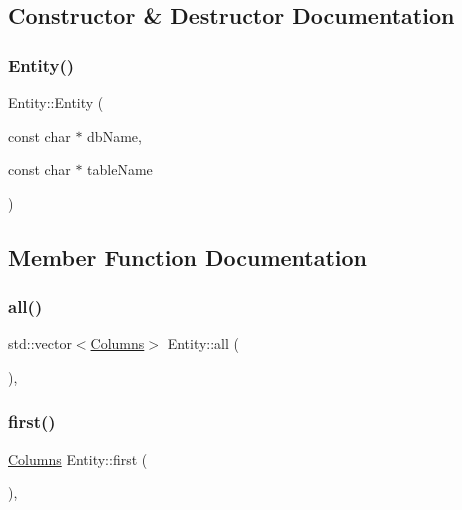 \subsection{Constructor \& Destructor Documentation}
\mbox{\label{classEntity_a123f776b73726fba47ee376b2f903ea7}} 
\subsubsection{\texorpdfstring{Entity()}{Entity()}}
{\footnotesize\ttfamily Entity\+::\+Entity (\begin{DoxyParamCaption}\item[{const char $\ast$}]{db\+Name,  }\item[{const char $\ast$}]{table\+Name }\end{DoxyParamCaption})\hspace{0.3cm}{\ttfamily [inline]}}



\subsection{Member Function Documentation}
\mbox{\label{classEntity_aae8be1f7e39217b5abf629e5149958c5}} 
\subsubsection{\texorpdfstring{all()}{all()}}
{\footnotesize\ttfamily std\+::vector$<$\mbox{\hyperlink{classColumns}{Columns}}$>$ Entity\+::all (\begin{DoxyParamCaption}{ }\end{DoxyParamCaption})\hspace{0.3cm}{\ttfamily [inline]}, {\ttfamily [protected]}}

\mbox{\label{classEntity_a3b769f023811c9f6d8b6d18305173703}} 
\subsubsection{\texorpdfstring{first()}{first()}}
{\footnotesize\ttfamily \mbox{\hyperlink{classColumns}{Columns}} Entity\+::first (\begin{DoxyParamCaption}{ }\end{DoxyParamCaption})\hspace{0.3cm}{\ttfamily [inline]}, {\ttfamily [protected]}}

